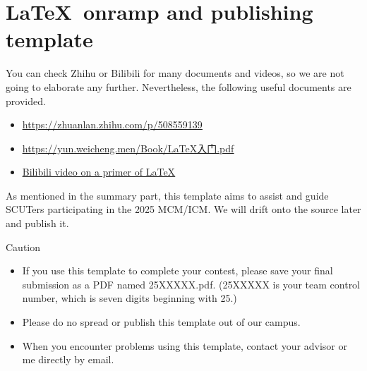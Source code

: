 \documentclass[12pt]{article}  %
\begin{document}
 
 \section{\LaTeX ~onramp and publishing template}
 
 You can check Zhihu or Bilibili for many documents
 and videos, so we are not going to elaborate any further. Nevertheless, the following useful documents are provided. 
 
 \begin{itemize}
     \setlength{\parsep}{0ex} %
     \setlength{\topsep}{2ex} %
     \setlength{\itemsep}{1ex} %
     \item \href{https://zhuanlan.zhihu.com/p/508559139}{\underline{https://zhuanlan.zhihu.com/p/508559139}}
     \item \href{https://yun.weicheng.men/Book/LaTeX%E5%85%A5%E9%97%A8.pdf}{\underline{https://yun.weicheng.men/Book/LaTeX入门.pdf}}	
     \item 
     \href{https://www.bilibili.com/video/BV1s7411U7Pr/?spm_id_from=333.337.search-card.all.click}{\underline{Bilibili video on a primer of \LaTeX}}
 \end{itemize}
 
 As mentioned in the summary part, this template aims to assist and guide SCUTers participating in the 2025 MCM/ICM. We will drift onto the source later and publish it. 
 
 
 
 \begin{mybox}{Caution}
     \begin{itemize}
         \setlength{\parsep}{0ex} %
         \setlength{\topsep}{2ex} %
         \setlength{\itemsep}{1ex} %
         \item If you use this template to complete your contest, please save your final submission as a PDF named 25XXXXX.pdf. (25XXXXX is your team control number, which is seven digits beginning with 25.)
         \item Please do no spread or publish this template out of our campus. 
         \item When you encounter problems using this template, contact your advisor or me directly by email.
     \end{itemize}
 \end{mybox}
 
  
 
\end{document}
